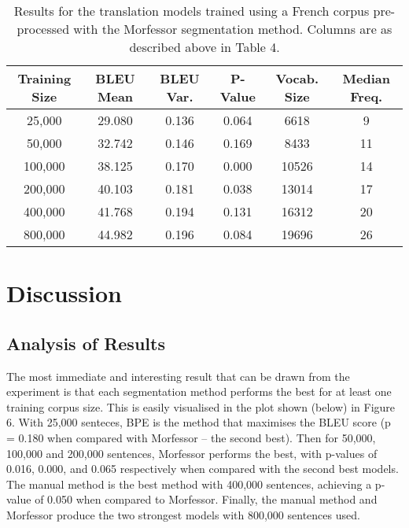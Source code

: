 \documentclass[11pt]{article}
\begin{document}
\begin{table}[h]
\centering
\begin{tabular}{|c|c|c|c|c|c|}
\hline
Training Size & BLEU Mean & BLEU Var. & P-Value & Vocab. Size & Median Freq. \\ \hline
25,000        & 29.080    & 0.136     & 0.064   & 6618        & 9            \\
50,000        & 32.742    & 0.146     & 0.169   & 8433        & 11           \\
100,000       & 38.125    & 0.170     & 0.000   & 10526       & 14           \\
200,000       & 40.103    & 0.181     & 0.038   & 13014       & 17           \\
400,000       & 41.768    & 0.194     & 0.131   & 16312       & 20           \\
800,000       & 44.982    & 0.196     & 0.084   & 19696       & 26           \\ \hline
\end{tabular}
\caption{Results for the translation models trained using a French corpus pre-processed with the Morfessor segmentation method. Columns are as described above in Table 4.}
\label{tab:morfessor}
\end{table}

\newpage

\section{Discussion}

\subsection{Analysis of Results}

The most immediate and interesting result that can be drawn from the experiment is that each segmentation method performs the best for at least one training corpus size. This is easily visualised in the plot shown (below) in Figure 6. With 25,000 senteces, BPE is the method that maximises the BLEU score (p = 0.180 when compared with Morfessor -- the second best). Then for 50,000, 100,000 and 200,000 sentences, Morfessor performs the best, with p-values of 0.016, 0.000, and 0.065 respectively when compared with the second best models. The manual method is the best method with 400,000 sentences, achieving a p-value of 0.050 when compared to Morfessor. Finally, the manual method and Morfessor produce the two strongest models with 800,000 sentences used.
\end{document}
